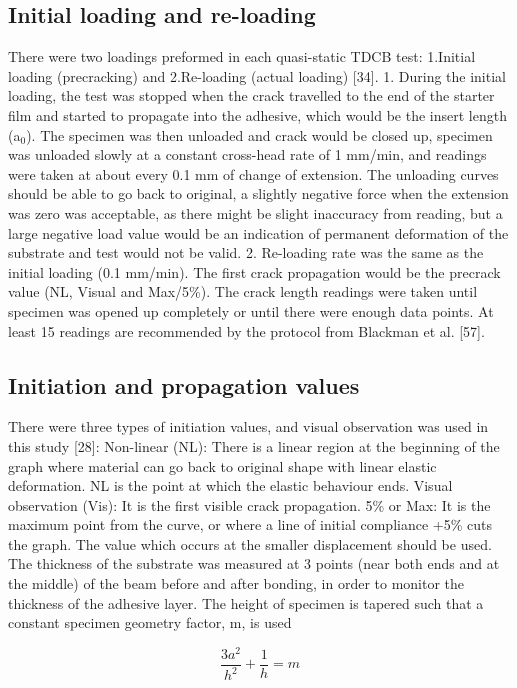 \documentclass[numbers=noendperiod,chapterprefix=on]{icldt} %
\begin{document}
\subsection{Initial loading and re-loading}
There were two loadings preformed in each quasi-static TDCB test: 1.Initial loading (precracking) and 2.Re-loading (actual loading) [34].
1. During the initial loading, the test was stopped when the crack travelled to the end of the starter film and started to propagate into the adhesive, which would be the insert length (a$_0$).
The specimen was then unloaded and crack would be closed up, specimen was unloaded slowly at a constant cross-head rate of 1 mm/min, and readings were taken at about every 0.1 mm of change of extension. The unloading curves should be able to go back to original, a slightly negative force when the extension was zero was acceptable, as there might be slight inaccuracy from reading, but a large negative load value would be an indication of permanent deformation of the substrate and test would not be valid.
2. Re-loading rate was the same as the initial loading (0.1 mm/min). The first crack propagation would be the precrack value (NL, Visual and Max/5\%). The crack length readings were taken until specimen was opened up completely or until there were enough data points. At least 15 readings are recommended by the protocol from Blackman et al. [57].

\subsection{Initiation and propagation values}
There were three types of initiation values, and visual observation was used in this study [28]:
Non-linear (NL): There is a linear region at the beginning of the graph where material can go back to original shape with linear elastic deformation. NL is the point at which the elastic behaviour ends.
Visual observation (Vis): It is the first visible crack propagation.
5\% or Max: It is the maximum point from the curve, or where a line of initial compliance +5\% cuts the graph. The value which occurs at the smaller displacement should be used.
The thickness of the substrate was measured at 3 points (near both ends and at the middle) of the beam before and after bonding, in order to monitor the thickness of the adhesive layer.
The height of specimen is tapered such that a constant specimen geometry factor, m, is used

\begin{equation} 
\frac{3a^2}{h^2}+\frac{1}{h}=m
\end{equation}
\end{document}
